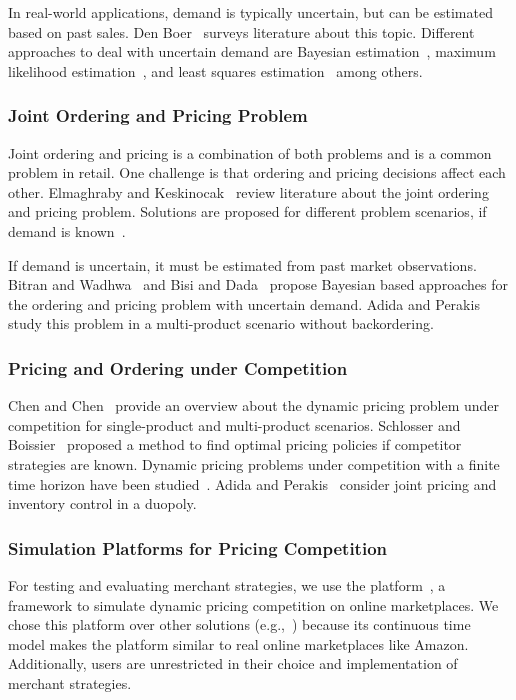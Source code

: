 In real-world applications, demand is typically uncertain, but can be estimated based on past sales.
Den Boer~\cite{den2015dynamic} surveys literature about this topic.
Different approaches to deal with uncertain demand are Bayesian estimation~\cite{araman2011revenue}, maximum likelihood estimation~\cite{DBLP:journals/ior/BroderR12}, and least squares estimation~\cite{le2008data} among others.

\subsubsection*{Joint Ordering and Pricing Problem}
Joint ordering and pricing is a combination of both problems and is a common problem in retail.
One challenge is that ordering and pricing decisions affect each other.
Elmaghraby and Keskinocak~\cite{elmaghraby2003dynamic} review literature about the joint ordering and pricing problem.
Solutions are proposed for different problem scenarios, if demand is known~\cite{thomas1970price,DBLP:journals/ior/FedergruenH99,chen2003coordinating,simchi2014integration}.

If demand is uncertain, it must be estimated from past market observations.
Bitran and Wadhwa~\cite{bitran1996methodology} and Bisi and Dada~\cite{bisi2007dynamic} propose Bayesian based approaches for the ordering and pricing problem with uncertain demand.
Adida and Perakis~\cite{DBLP:journals/mp/AdidaP06,DBLP:journals/anor/AdidaP10} study this problem in a multi-product scenario without backordering.

\subsubsection*{Pricing and Ordering under Competition}
Chen and Chen~\cite{chen2015recent} provide an overview about the dynamic pricing problem under competition for single-product and multi-product scenarios.
Schlosser and Boissier~\cite{Schlosser_2017} proposed a method to find optimal pricing policies if competitor strategies are known.
Dynamic pricing problems under competition with a finite time horizon have been studied~\cite{DBLP:journals/mansci/Martinez-de-AlbenizT11,Schlosser_2018}.
Adida and Perakis~\cite{DBLP:journals/ior/AdidaP10} consider joint pricing and inventory control in a duopoly.

\subsubsection*{Simulation Platforms for Pricing Competition}
For testing and evaluating merchant strategies, we use the \pricewars platform~\cite{edoc2017pricewars}, a framework to simulate dynamic pricing competition on online marketplaces.
We chose this platform over other solutions (e.g.,~\cite{morris2001simulation,DBLP:journals/ecr/DiMiccoMG03,DBLP:journals/icae/PintoVSPSM14}) because its continuous time model makes the platform similar to real online marketplaces like Amazon.
Additionally, users are unrestricted in their choice and implementation of merchant strategies.

